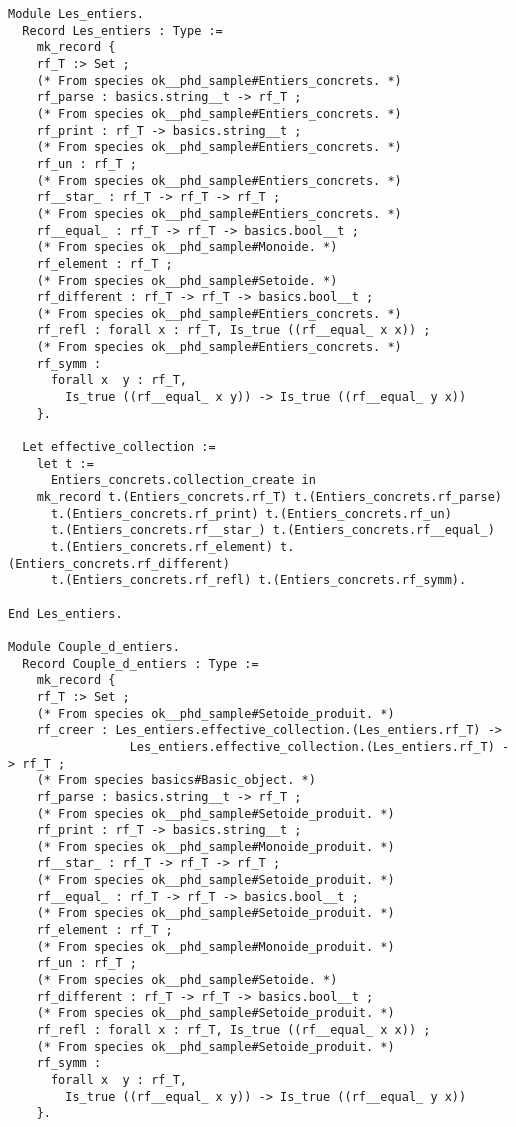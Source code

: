 {\footnotesize
\begin{lstlisting}[language=MyCoq,title=\coq\ code for collections]
Module Les_entiers.
  Record Les_entiers : Type :=
    mk_record {
    rf_T :> Set ;
    (* From species ok__phd_sample#Entiers_concrets. *)
    rf_parse : basics.string__t -> rf_T ;
    (* From species ok__phd_sample#Entiers_concrets. *)
    rf_print : rf_T -> basics.string__t ;
    (* From species ok__phd_sample#Entiers_concrets. *)
    rf_un : rf_T ;
    (* From species ok__phd_sample#Entiers_concrets. *)
    rf__star_ : rf_T -> rf_T -> rf_T ;
    (* From species ok__phd_sample#Entiers_concrets. *)
    rf__equal_ : rf_T -> rf_T -> basics.bool__t ;
    (* From species ok__phd_sample#Monoide. *)
    rf_element : rf_T ;
    (* From species ok__phd_sample#Setoide. *)
    rf_different : rf_T -> rf_T -> basics.bool__t ;
    (* From species ok__phd_sample#Entiers_concrets. *)
    rf_refl : forall x : rf_T, Is_true ((rf__equal_ x x)) ;
    (* From species ok__phd_sample#Entiers_concrets. *)
    rf_symm :
      forall x  y : rf_T,
        Is_true ((rf__equal_ x y)) -> Is_true ((rf__equal_ y x))
    }.
  
  Let effective_collection :=
    let t :=
      Entiers_concrets.collection_create in 
    mk_record t.(Entiers_concrets.rf_T) t.(Entiers_concrets.rf_parse)
      t.(Entiers_concrets.rf_print) t.(Entiers_concrets.rf_un)
      t.(Entiers_concrets.rf__star_) t.(Entiers_concrets.rf__equal_)
      t.(Entiers_concrets.rf_element) t.(Entiers_concrets.rf_different)
      t.(Entiers_concrets.rf_refl) t.(Entiers_concrets.rf_symm).
    
End Les_entiers.

Module Couple_d_entiers.
  Record Couple_d_entiers : Type :=
    mk_record {
    rf_T :> Set ;
    (* From species ok__phd_sample#Setoide_produit. *)
    rf_creer : Les_entiers.effective_collection.(Les_entiers.rf_T) ->
                 Les_entiers.effective_collection.(Les_entiers.rf_T) -> rf_T ;
    (* From species basics#Basic_object. *)
    rf_parse : basics.string__t -> rf_T ;
    (* From species ok__phd_sample#Setoide_produit. *)
    rf_print : rf_T -> basics.string__t ;
    (* From species ok__phd_sample#Monoide_produit. *)
    rf__star_ : rf_T -> rf_T -> rf_T ;
    (* From species ok__phd_sample#Setoide_produit. *)
    rf__equal_ : rf_T -> rf_T -> basics.bool__t ;
    (* From species ok__phd_sample#Setoide_produit. *)
    rf_element : rf_T ;
    (* From species ok__phd_sample#Monoide_produit. *)
    rf_un : rf_T ;
    (* From species ok__phd_sample#Setoide. *)
    rf_different : rf_T -> rf_T -> basics.bool__t ;
    (* From species ok__phd_sample#Setoide_produit. *)
    rf_refl : forall x : rf_T, Is_true ((rf__equal_ x x)) ;
    (* From species ok__phd_sample#Setoide_produit. *)
    rf_symm :
      forall x  y : rf_T,
        Is_true ((rf__equal_ x y)) -> Is_true ((rf__equal_ y x))
    }.
  

\end{lstlisting}}
